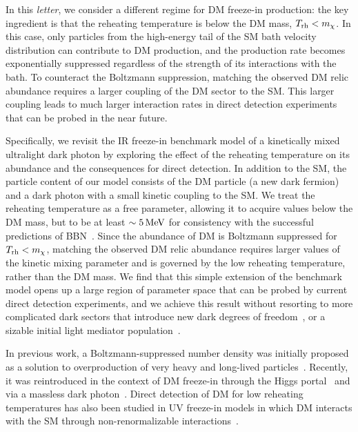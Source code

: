 \documentclass[notitlepage,nofootinbib,preprintnumbers,aps,superscriptaddress,twocolumn]{revtex4-1}
\begin{document}
In this \textit{letter}, we consider a different regime for DM  freeze-in production: the key ingredient is that the reheating temperature is below the DM mass, $T_{\rm rh} < m_\chi$. In this case, only particles from the high-energy tail of the SM bath velocity distribution can contribute to DM production, and the production rate  becomes exponentially suppressed regardless of the strength of its interactions with the bath. To counteract the Boltzmann suppression, matching the observed DM relic abundance requires a larger coupling of the DM sector to the SM.  This larger coupling leads to much larger interaction rates in direct detection experiments that can be probed in the near future.

Specifically, we revisit the IR freeze-in benchmark model of a kinetically mixed ultralight dark photon by exploring the effect of the reheating temperature on its abundance and the consequences for direct detection. In addition to the SM, the particle content of our model consists of the DM particle (a new dark fermion) and a dark photon with a small kinetic coupling to the SM. We treat the reheating temperature as a free parameter, allowing it to acquire values below the DM mass, but to be at least $\sim 5\, {\rm MeV}$ for consistency with the successful predictions of BBN~\cite{Hasegawa:2019jsa,Kawasaki:2000en}. Since the abundance of DM is Boltzmann suppressed for $T_{\rm rh} < m_\chi$, matching the observed DM relic abundance requires larger values of the kinetic mixing parameter and is governed by the low reheating temperature, rather than the DM mass. We find that this simple extension of the benchmark model opens up a large region of parameter space that can be probed by current direct detection experiments, and we achieve this result without resorting to more complicated dark sectors that introduce new dark degrees of freedom~\cite{Bhattiprolu:2023akk}, or a sizable initial light mediator population~\cite{Fernandez:2021iti}.

In previous work, a Boltzmann-suppressed number density was initially proposed as a solution to overproduction of very heavy and long-lived particles~\cite{Kuzmin:1997jua}. Recently, it was reintroduced in the context of DM freeze-in through the Higgs portal~\cite{Bringmann:2021sth,Cosme:2023xpa,Cosme:2024ndc,Arcadi:2024wwg} and via a massless dark photon~\cite{Gan:2023jbs}. Direct detection of DM for low reheating temperatures has also been studied in UV freeze-in models in which DM interacts with the SM through non-renormalizable interactions~\cite{Essig:2011nj,Bhattiprolu:2022sdd}.
\end{document}
